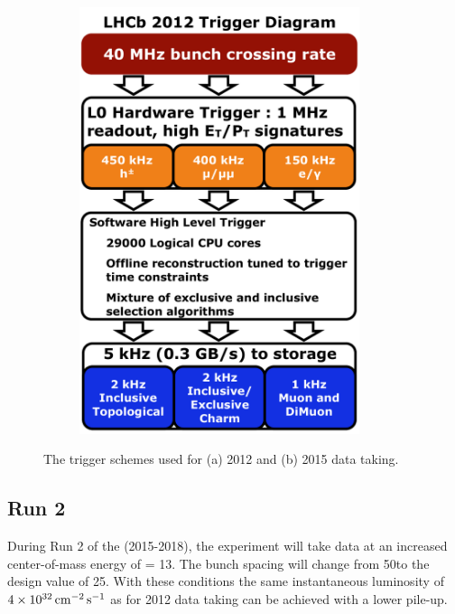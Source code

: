 \begin{figure}[!tb]
\begin{subfigure}{0.49\textwidth}
\includegraphics[width=0.9\textwidth]{figs/detector/trigger-run1.pdf}
\caption{}
\label{fig:trigger:run2}
\end{subfigure}
\caption{The trigger schemes used for (a) 2012 and (b) 2015 data taking.}
\label{fig:trigger}
\end{figure}

\subsection{\lhcb Run 2}
\label{sec:lhcb:lhcb-run2}

During Run 2 of the \lhc (2015-2018), the \lhcb experiment will take data at an increased center-of-mass energy of \sqs = 13\tev. The bunch spacing will change from 50\ns to the design value of 25\ns. With these conditions the same instantaneous luminosity of $4\times10^{32}\mathrm{ \,cm}^{-2}\mathrm{{\,s}}^{-1}$ as for 2012 data taking can be achieved with a lower pile-up. 

